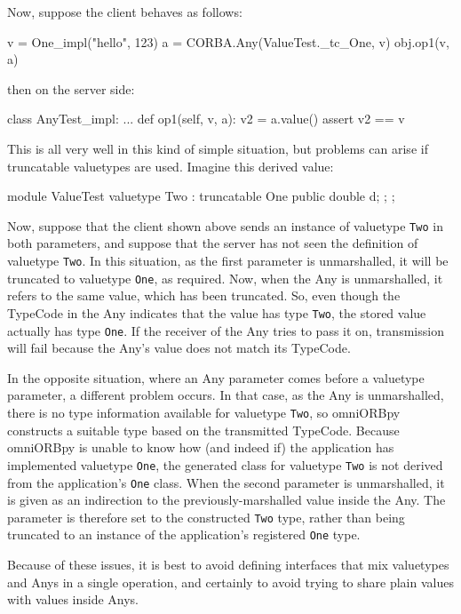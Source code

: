 \documentclass[draft,11pt,twoside,a4paper]{book}
\newcommand{\type}[1]{\texttt{#1}}
\begin{document}
Now, suppose the client behaves as follows:

\begin{pylisting}
v = One_impl("hello", 123)
a = CORBA.Any(ValueTest._tc_One, v)
obj.op1(v, a)
\end{pylisting}

then on the server side:

\begin{pylisting}
class AnyTest_impl:
    ...
    def op1(self, v, a):
        v2 = a.value()
        assert v2 == v
\end{pylisting}

This is all very well in this kind of simple situation, but problems
can arise if truncatable valuetypes are used. Imagine this derived
value:

\begin{idllisting}
module ValueTest {
  valuetype Two : truncatable One {
    public double d;
  };
};
\end{idllisting}

Now, suppose that the client shown above sends an instance of
valuetype \type{Two} in both parameters, and suppose that the server
has not seen the definition of valuetype \type{Two}. In this
situation, as the first parameter is unmarshalled, it will be
truncated to valuetype \type{One}, as required. Now, when the Any is
unmarshalled, it refers to the same value, which has been truncated.
So, even though the TypeCode in the Any indicates that the value has
type \type{Two}, the stored value actually has type \type{One}. If the
receiver of the Any tries to pass it on, transmission will fail
because the Any's value does not match its TypeCode.

In the opposite situation, where an Any parameter comes before a
valuetype parameter, a different problem occurs. In that case, as the
Any is unmarshalled, there is no type information available for
valuetype \type{Two}, so omniORBpy constructs a suitable type based on
the transmitted TypeCode. Because omniORBpy is unable to know how (and
indeed if) the application has implemented valuetype \type{One}, the
generated class for valuetype \type{Two} is not derived from the
application's \type{One} class. When the second parameter is
unmarshalled, it is given as an indirection to the
previously-marshalled value inside the Any. The parameter is therefore
set to the constructed \type{Two} type, rather than being truncated to
an instance of the application's registered \type{One} type.

Because of these issues, it is best to avoid defining interfaces that
mix valuetypes and Anys in a single operation, and certainly to avoid
trying to share plain values with values inside Anys.




\backmatter


\end{document}
